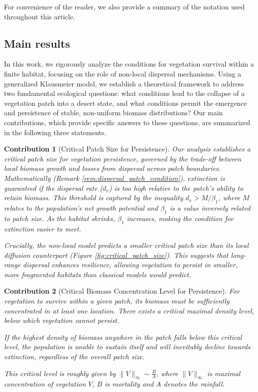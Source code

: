 \documentclass[11pt, a4paper]{article}
\theoremstyle{break}
\theoremstyle{break}
\theoremstyle{break}
\theoremstyle{break}
\theoremstyle{break}
\theoremstyle{break}
\theoremstyle{break}
\theoremstyle{break}
\theoremstyle{break}
\newtheorem{main_contrib}{Contribution}
\begin{document}
For convenience of the reader, we also provide a summary of the notation used throughout this article.

\subsection{Main results}

In this work, we rigorously analyze the conditions for vegetation survival within a finite habitat, focusing on the role of non-local dispersal mechanisms. Using a generalized Klausmeier model, we establish a theoretical framework to address two fundamental ecological questions: what conditions lead to the collapse of a vegetation patch into a desert state, and what conditions permit the emergence and persistence of stable, non-uniform biomass distributions? Our main contributions, which provide specific answers to these questions, are summarized in the following three statements.

\begin{main_contrib}[Critical Patch Size for Persistence]
Our analysis establishes a critical patch size for vegetation persistence, governed by the trade-off between local biomass growth and losses from dispersal across patch boundaries. Mathematically (Remark \ref{rem:dispersal_patch_condition}), extinction is guaranteed if the dispersal rate ($d_v$) is too high relative to the patch's ability to retain biomass. This threshold is captured by the inequality $d_v > M/\beta_1$, where $M$ relates to the population's net growth potential and $\beta_1$ is a value inversely related to patch size. As the habitat shrinks, $\beta_1$ increases, making the condition for extinction easier to meet.

Crucially, the non-local model predicts a smaller critical patch size than its local diffusion counterpart (Figure \ref{fig:critical_patch_size}). This suggests that long-range dispersal enhances resilience, allowing vegetation to persist in smaller, more fragmented habitats than classical models would predict.
\end{main_contrib}

\begin{main_contrib}[Critical Biomass Concentration Level for Persistence]
For vegetation to survive within a given patch, its biomass must be sufficiently concentrated in at least one location. There exists a critical maximal density level, below which vegetation cannot persist. 

If the highest density of biomass anywhere in the patch falls below this critical level, the population is unable to sustain itself and will inevitably decline towards extinction, regardless of the overall patch size.

This critical level is roughly given by $\|V\|_\infty \sim \frac{B}{A}$, where $\|V\|_\infty$ is maximal concentration of vegetation $V$, $B$ is mortality and $A$ denotes the rainfall.
\end{main_contrib}
\end{document}
